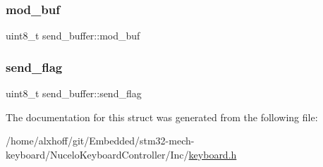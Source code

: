 \mbox{\label{structsend__buffer_a1ed1ea0b6d0ffbe2af4f8aff77cd5d56}} 
\subsubsection{\texorpdfstring{mod\+\_\+buf}{mod\_buf}}
{\footnotesize\ttfamily uint8\+\_\+t send\+\_\+buffer\+::mod\+\_\+buf}

\mbox{\label{structsend__buffer_a2584076f9d2f17205d4625411b0d5808}} 
\subsubsection{\texorpdfstring{send\+\_\+flag}{send\_flag}}
{\footnotesize\ttfamily uint8\+\_\+t send\+\_\+buffer\+::send\+\_\+flag}



The documentation for this struct was generated from the following file\+:\begin{DoxyCompactItemize}
\item 
/home/alxhoff/git/\+Embedded/stm32-\/mech-\/keyboard/\+Nucelo\+Keyboard\+Controller/\+Inc/\hyperlink{keyboard_8h}{keyboard.\+h}\end{DoxyCompactItemize}

